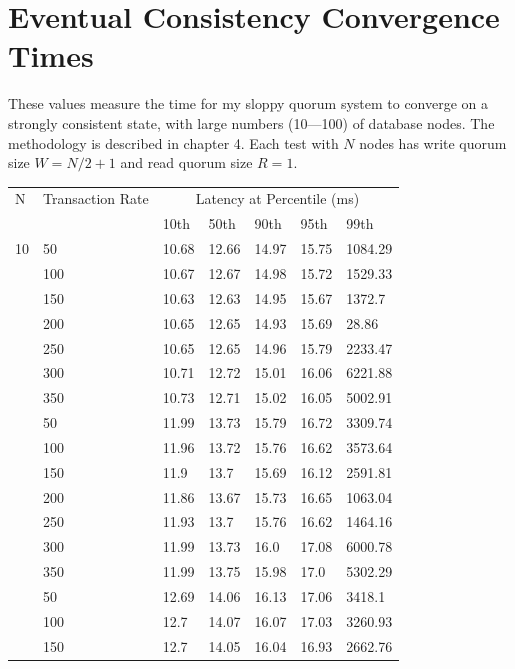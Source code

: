 \documentclass[12pt,a4paper,twoside,openany]{report}
\begin{document}
\appendix

\chapter{Eventual Consistency Convergence Times} \label{convt}

These values measure the time for my sloppy quorum system to converge on a strongly consistent state, with large numbers (10---100) of database nodes. The methodology is described in chapter 4. Each test with $N$ nodes has write quorum size $W = N / 2 + 1$ and read quorum size $R = 1$.

\begin{longtable}{@{} l l l l l l l @{}}
\toprule
N & Transaction Rate & \multicolumn{5}{c}{Latency at Percentile (ms)} \\
& & 10th & 50th & 90th & 95th & 99th \\
\hline
\endhead
10 & 50 & 10.68 & 12.66 & 14.97 & 15.75 & 1084.29 \\
& 100 & 10.67 & 12.67 & 14.98 & 15.72 & 1529.33 \\
& 150 & 10.63 & 12.63 & 14.95 & 15.67 & 1372.7 \\
& 200 & 10.65 & 12.65 & 14.93 & 15.69 & 28.86 \\
& 250 & 10.65 & 12.65 & 14.96 & 15.79 & 2233.47 \\
& 300 & 10.71 & 12.72 & 15.01 & 16.06 & 6221.88 \\
& 350 & 10.73 & 12.71 & 15.02 & 16.05 & 5002.91 \\
\hline
\pagebreak[3]
20 & 50 & 11.99 & 13.73 & 15.79 & 16.72 & 3309.74 \\
& 100 & 11.96 & 13.72 & 15.76 & 16.62 & 3573.64 \\
& 150 & 11.9 & 13.7 & 15.69 & 16.12 & 2591.81 \\
& 200 & 11.86 & 13.67 & 15.73 & 16.65 & 1063.04 \\
& 250 & 11.93 & 13.7 & 15.76 & 16.62 & 1464.16 \\
& 300 & 11.99 & 13.73 & 16.0 & 17.08 & 6000.78 \\
& 350 & 11.99 & 13.75 & 15.98 & 17.0 & 5302.29 \\
\hline
\pagebreak[3]
30 & 50 & 12.69 & 14.06 & 16.13 & 17.06 & 3418.1 \\
& 100 & 12.7 & 14.07 & 16.07 & 17.03 & 3260.93 \\
& 150 & 12.7 & 14.05 & 16.04 & 16.93 & 2662.76 \\

\end{longtable}
\end{document}
